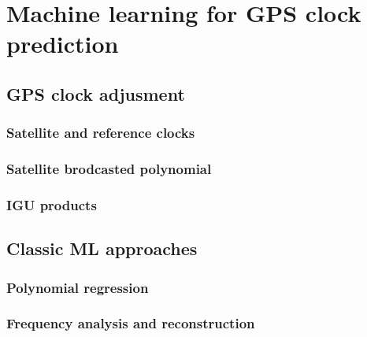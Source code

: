 \chapter{Machine learning for GPS clock prediction}


\section{GPS clock adjusment}

\subsection{Satellite and reference clocks}

\subsection{Satellite brodcasted polynomial}

\subsection{IGU products}

\section{Classic ML approaches}

\subsection{Polynomial regression}

\subsection{Frequency analysis and reconstruction}

